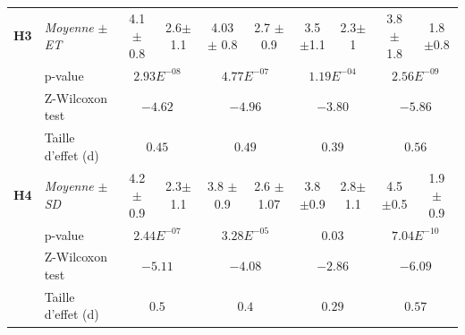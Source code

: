 {\begin{table}[p]
\begin{adjustbox}{angle=90}
\begin{tabular}{|ll|c|c|c|c|c|c|c|c|}
						\newline \multirow{4}{*} {\textbf{H3}} &\multicolumn{1}{|l|}{ \textit{Moyenne} $\pm$ \textit{ET} } & 4.1 $\pm$ 0.8 & 2.6$\pm$ 1.1 & 4.03 $\pm$ 0.8 & 2.7 $\pm$0.9 &3.5 $\pm$1.1 & 2.3$\pm$ 1 & 3.8 $\pm$ 1.8 & 1.8 $\pm$0.8 \\
						\cline{2-10}	
						\newline & \multicolumn{1}{|l|}{p-value}  & \multicolumn{2}{c|}{ $2.93E^{-08}$} & \multicolumn{2}{c|}{ $4.77E^{-07}$} & \multicolumn{2}{c|}{ $1.19E^{-04}$}& \multicolumn{2}{c|}{ $2.56E^{-09}$}\\
						\cline{2-10}	
						\newline & \multicolumn{1}{|l|}{Z-Wilcoxon test} & \multicolumn{2}{c|}{ $-4.62$} & \multicolumn{2}{c|}{ $-4.96$} & \multicolumn{2}{c|}{ $-3.80$}& \multicolumn{2}{c|}{ $-5.86$}\\
						\cline{2-10}	
						\newline & \multicolumn{1}{|l|}{Taille d'effet (d)} & \multicolumn{2}{c|}{ $0.45$} & \multicolumn{2}{c|}{ $0.49$} & \multicolumn{2}{c|}{ $0.39$}& \multicolumn{2}{c|}{ $0.56$}\\
						\hline	
						
						\newline \multirow{4}{*} {\textbf{H4}} & \multicolumn{1}{|l|}{ \textit{Moyenne} $\pm$ \textit{SD} } & 4.2 $\pm$ 0.9 & 2.3$\pm$ 1.1  & 3.8 $\pm$0.9 & 2.6 $\pm$1.07 & 3.8 $\pm$0.9  & 2.8$\pm$ 1.1  & 4.5 $\pm$0.5  & 1.9 $\pm$ 0.9\\
						\cline{2-10}
						\newline & \multicolumn{1}{|l|}{p-value} & \multicolumn{2}{c|}{ $2.44E^{-07}$} & \multicolumn{2}{c|}{ $3.28E^{-05}$} & \multicolumn{2}{c|}{ $0.03$}& \multicolumn{2}{c|}{ $7.04E^{-10}$}\\
						\cline{2-10}	
						\newline & \multicolumn{1}{|l|}{Z-Wilcoxon test} & \multicolumn{2}{c|}{ $-5.11$} & \multicolumn{2}{c|}{ $-4.08$} & \multicolumn{2}{c|}{ $-2.86$}& \multicolumn{2}{c|}{ $-6.09$}\\
						\cline{2-10}	
						\newline & \multicolumn{1}{|l|}{Taille d'effet (d)} & \multicolumn{2}{c|}{ $0.5$} & \multicolumn{2}{c|}{ $0.4$} & \multicolumn{2}{c|}{ $0.29$}& \multicolumn{2}{c|}{ $0.57$}\\
						\hline	
					\end{tabular}
					

\end{adjustbox}
\end{table}}
